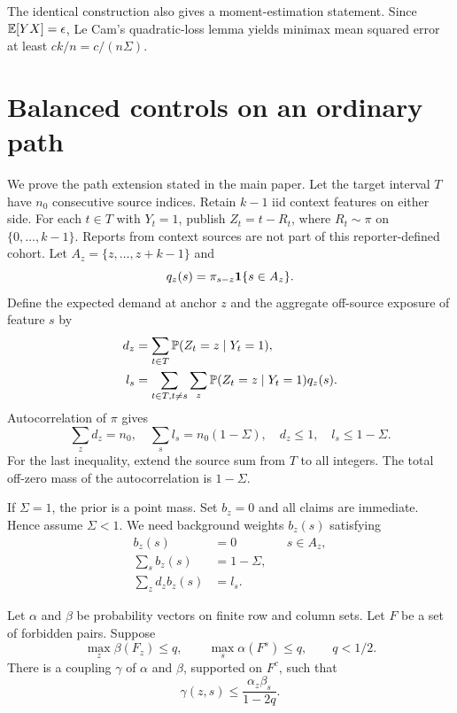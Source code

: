 The identical construction also gives a moment-estimation statement. Since $\mathbb E[YX]=\epsilon$, Le Cam's quadratic-loss lemma yields minimax mean squared error at least $ck/n=c/(n\Sigma)$.

\section{Balanced controls on an ordinary path}

We prove the path extension stated in the main paper. Let the target interval $T$ have $n_0$ consecutive source indices. Retain $k-1$ iid context features on either side. For each $t\in T$ with $Y_t=1$, publish $Z_t=t-R_t$, where $R_t\sim\pi$ on $\{0,\ldots,k-1\}$. Reports from context sources are not part of this reporter-defined cohort. Let $A_z=\{z,\ldots,z+k-1\}$ and
\[
 q_z(s)=\pi_{s-z}\mathbf 1\{s\in A_z\}.
\]
Define the expected demand at anchor $z$ and the aggregate off-source exposure of feature $s$ by
\begin{align*}
 d_z&=\sum_{t\in T}\mathbb P(Z_t=z\mid Y_t=1),\\
 l_s&=\sum_{t\in T,t\ne s}\sum_z\mathbb P(Z_t=z\mid Y_t=1)q_z(s).
\end{align*}
Autocorrelation of $\pi$ gives
\begin{equation}
 \sum_zd_z=n_0,\quad \sum_sl_s=n_0(1-\Sigma),\quad
 d_z\le1,\quad l_s\le1-\Sigma.
 \label{app:eq:pathmarginals}
\end{equation}
For the last inequality, extend the source sum from $T$ to all integers. The total off-zero mass of the autocorrelation is $1-\Sigma$.

If $\Sigma=1$, the prior is a point mass. Set $b_z=0$ and all claims are
immediate. Hence assume $\Sigma<1$. We need background weights $b_z(s)$ satisfying
\begin{align}
 b_z(s)&=0 &&s\in A_z,\label{app:eq:avoid}\\
 \sum_sb_z(s)&=1-\Sigma,\label{app:eq:rowmass}\\
 \sum_zd_zb_z(s)&=l_s.\label{app:eq:balance}
\end{align}

\begin{lemma}\label{app:lem:coupling}
Let $\alpha$ and $\beta$ be probability vectors on finite row and column sets. Let $F$ be a set of forbidden pairs. Suppose
\[
 \max_z\beta(F_z)\le q,\qquad
 \max_s\alpha(F^s)\le q,\qquad q<1/2.
\]
There is a coupling $\gamma$ of $\alpha$ and $\beta$, supported on $F^c$, such that
\[
 \gamma(z,s)\le\frac{\alpha_z\beta_s}{1-2q}.
\]
\end{lemma}

